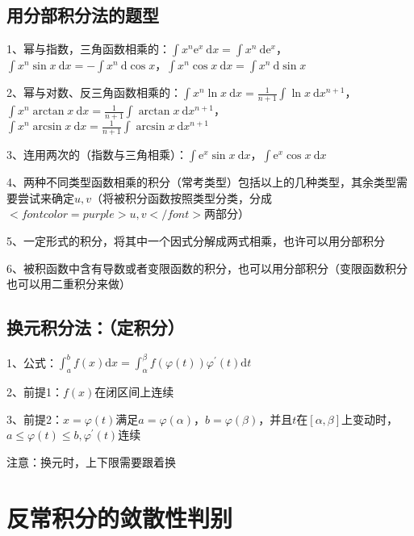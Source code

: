 \subsection{用分部积分法的题型}

1、幂与指数，三角函数相乘的：$ \int x^{n} \mathrm{e}^{x} \mathrm{~d} x=\int x^{n} \mathrm{~d} \mathrm{e}^{x} $，$ \int x^{n} \sin x \mathrm{~d} x=-\int x^{n} \mathrm{~d} \cos x $，$ \int x^{n} \cos x \mathrm{~d} x=\int x^{n} \mathrm{~d} \sin x $

2、幂与对数、反三角函数相乘的：$ \int x^{n} \ln x \mathrm{~d} x=\frac{1}{n+1} \int \ln x \mathrm{~d} x^{n+1} $，$ \int x^{n} \arctan x \mathrm{~d} x=\frac{1}{n+1} \int \arctan x \mathrm{~d} x^{n+1} $，$ \int x^{n} \arcsin x \mathrm{~d} x=\frac{1}{n+1} \int \arcsin x \mathrm{~d} x^{n+1} $

3、连用两次的（指数与三角相乘）：$ \int \mathrm{e}^{x} \sin x \mathrm{~d} x $，$ \int \mathrm{e}^{x} \cos x \mathrm{~d} x $

4、两种不同类型函数相乘的积分（常考类型）包括以上的几种类型，其余类型需要尝试来确定$ u,v $（将被积分函数按照类型分类，分成$ <font color=purple>u,v</font> $两部分）

5、一定形式的积分，将其中一个因式分解成两式相乘，也许可以用分部积分

6、被积函数中含有导数或者变限函数的积分，也可以用分部积分（变限函数积分也可以用二重积分来做）



\subsection{换元积分法：（定积分）}

1、公式：$ \int_{a}^{b} f(x) \mathrm{d} x=\int_{\alpha}^{\beta} f(\varphi(t)) \varphi^{\prime}(t) \mathrm{d} t $

2、前提1：$ f(x) $在闭区间上连续

3、前提2：$ x=\varphi(t) $满足$ a=\varphi(\alpha) $，$ b=\varphi(\beta) $，并且$ t $在$ [{\alpha},{\beta}] $上变动时，$ a \leqslant \varphi(t) \leqslant b, \varphi^{\prime}(t) $连续

注意：换元时，上下限需要跟着换

\section{反常积分的敛散性判别}



